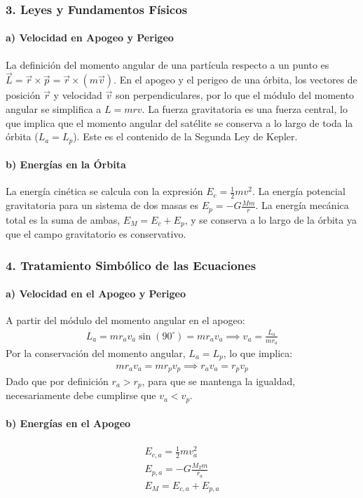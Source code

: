 \subsubsection*{3. Leyes y Fundamentos Físicos}
\paragraph*{a) Velocidad en Apogeo y Perigeo}
La definición del momento angular de una partícula respecto a un punto es $\vec{L} = \vec{r} \times \vec{p} = \vec{r} \times (m\vec{v})$. En el apogeo y el perigeo de una órbita, los vectores de posición $\vec{r}$ y velocidad $\vec{v}$ son perpendiculares, por lo que el módulo del momento angular se simplifica a $L = mrv$.
La fuerza gravitatoria es una fuerza central, lo que implica que el momento angular del satélite se conserva a lo largo de toda la órbita ($L_a = L_p$). Este es el contenido de la Segunda Ley de Kepler.

\paragraph*{b) Energías en la Órbita}
La energía cinética se calcula con la expresión $E_c = \frac{1}{2}mv^2$. La energía potencial gravitatoria para un sistema de dos masas es $E_p = -G\frac{Mm}{r}$. La energía mecánica total es la suma de ambas, $E_M = E_c + E_p$, y se conserva a lo largo de la órbita ya que el campo gravitatorio es conservativo.

\subsubsection*{4. Tratamiento Simbólico de las Ecuaciones}
\paragraph*{a) Velocidad en el Apogeo y Perigeo}
A partir del módulo del momento angular en el apogeo:
\begin{gather}
    L_a = m r_a v_a \sin(90^\circ) = m r_a v_a \implies v_a = \frac{L_a}{m r_a}
\end{gather}
Por la conservación del momento angular, $L_a = L_p$, lo que implica:
\begin{gather}
    m r_a v_a = m r_p v_p \implies r_a v_a = r_p v_p
\end{gather}
Dado que por definición $r_a > r_p$, para que se mantenga la igualdad, necesariamente debe cumplirse que $v_a < v_p$.

\paragraph*{b) Energías en el Apogeo}
\begin{gather}
    E_{c,a} = \frac{1}{2} m v_a^2 \\
    E_{p,a} = -G \frac{M_T m}{r_a} \\
    E_M = E_{c,a} + E_{p,a}
\end{gather}

